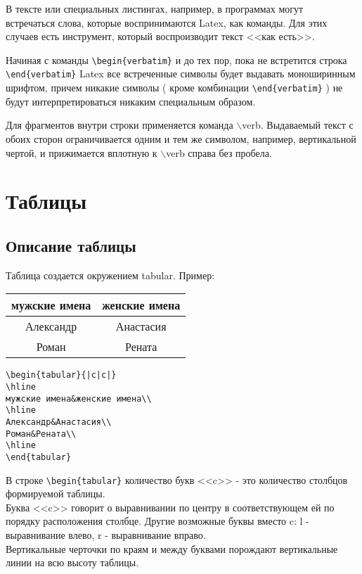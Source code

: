 В тексте или специальных листингах, например, в программах могут\\встречаться слова, которые воспринимаются Latex, как команды. Для этих случаев есть инструмент, который воспроизводит текст <<как есть>>.

Начиная с команды \verb|\begin{verbatim}| и до тех пор, пока не встретится строка \verb|\end{verbatim}| Latex все встреченные символы будет выдавать моноширинным шрифтом, причем никакие символы ( кроме комбинации 
\verb|\end{verbatim}|  ) не будут интерпретироваться никаким специальным образом.

Для  фрагментов внутри строки применяется команда $\backslash$verb. Выдаваемый текст с обоих сторон ограничивается одним и тем же символом, например, вертикальной чертой, и прижимается вплотную к  $\backslash$verb справа без пробела.

\chapter{Таблицы}

\section{Описание таблицы}

Таблица создается окружением tabular. Пример:\\


\begin{tabular}{|c|c|}
\hline
мужские имена&женские имена\\
\hline
Александр&Анастасия\\
Роман&Рената\\
\hline
\end{tabular}

\begin{verbatim}
\begin{tabular}{|c|c|}
\hline
мужские имена&женские имена\\
\hline
Александр&Анастасия\\
Роман&Рената\\
\hline
\end{tabular}
\end{verbatim}

В строке \verb|\begin{tabular}| количество букв <<c>> - это количество столбцов формируемой таблицы.\\
Буква <<c>> говорит о выравнивании по центру в соответствующем ей по порядку расположения столбце. Другие возможные буквы вместо c: l - выравнивание влево, r - выравнивание вправо. \\
Вертикальные черточки по краям и между буквами порождают вертикальные линии на всю высоту таблицы.

